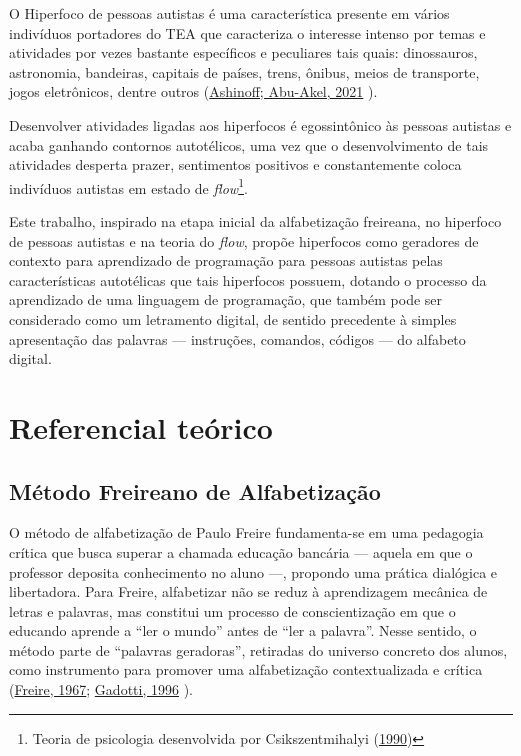 \documentclass[
  12pt,
  a4paper,
]{article}
\begin{document}
O Hiperfoco de pessoas autistas é uma característica presente em vários
indivíduos portadores do TEA que caracteriza o interesse intenso por
temas e atividades por vezes bastante específicos e peculiares tais
quais: dinossauros, astronomia, bandeiras, capitais de países, trens,
ônibus, meios de transporte, jogos eletrônicos, dentre outros
(\protect\hyperlink{ref-ashinoff2021}{Ashinoff; Abu-Akel, 2021} ).

Desenvolver atividades ligadas aos hiperfocos é egossintônico às pessoas
autistas e acaba ganhando contornos autotélicos, uma vez que o
desenvolvimento de tais atividades desperta prazer, sentimentos
positivos e constantemente coloca indivíduos autistas em estado de
\emph{flow}\footnote{ Teoria de psicologia desenvolvida por
  Csikszentmihalyi (\protect\hyperlink{ref-csikszentmihalyi1990}{1990})}.

Este trabalho, inspirado na etapa inicial da alfabetização freireana, no
hiperfoco de pessoas autistas e na teoria do \emph{flow}, propõe
hiperfocos como geradores de contexto para aprendizado de programação
para pessoas autistas pelas características autotélicas que tais
hiperfocos possuem, dotando o processo da aprendizado de uma linguagem
de programação, que também pode ser considerado como um letramento
digital, de sentido precedente à simples apresentação das palavras ---
instruções, comandos, códigos --- do alfabeto digital.

\hypertarget{sec:referencial-teorico}{%
\section{Referencial teórico}\label{sec:referencial-teorico}}

\hypertarget{muxe9todo-freireano-de-alfabetizauxe7uxe3o}{%
\subsection{Método Freireano de
Alfabetização}\label{muxe9todo-freireano-de-alfabetizauxe7uxe3o}}

O método de alfabetização de Paulo Freire fundamenta-se em uma pedagogia
crítica que busca superar a chamada educação bancária --- aquela em que
o professor deposita conhecimento no aluno ---, propondo uma prática
dialógica e libertadora. Para Freire, alfabetizar não se reduz à
aprendizagem mecânica de letras e palavras, mas constitui um processo de
conscientização em que o educando aprende a ``ler o mundo'' antes de
``ler a palavra''. Nesse sentido, o método parte de ``palavras
geradoras'', retiradas do universo concreto dos alunos, como instrumento
para promover uma alfabetização contextualizada e crítica
(\protect\hyperlink{ref-freire1967}{Freire, 1967};
\protect\hyperlink{ref-gadotti1996}{Gadotti, 1996} ).
\end{document}

